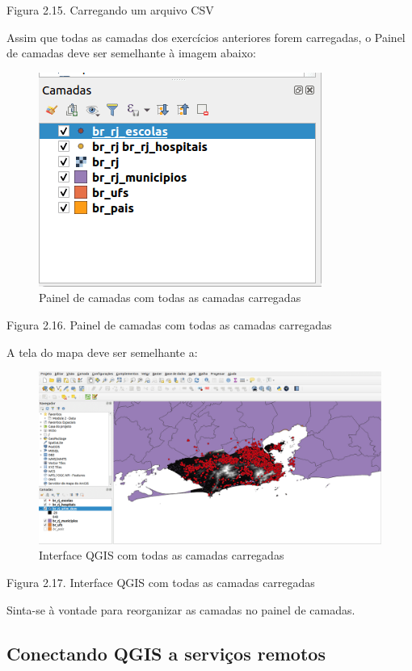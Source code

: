 \documentclass[
]{krantz}
\begin{document}
Figura 2.15. Carregando um arquivo CSV

Assim que todas as camadas dos exercícios anteriores forem carregadas, o Painel de camadas deve ser semelhante à imagem abaixo:

\begin{figure}
\centering
\includegraphics{media/modulo2/layers-panel-2.png}
\caption{Painel de camadas com todas as camadas carregadas}
\end{figure}

Figura 2.16. Painel de camadas com todas as camadas carregadas

A tela do mapa deve ser semelhante a:

\begin{figure}
\centering
\includegraphics{media/modulo2/map-canvas-1.png}
\caption{Interface QGIS com todas as camadas carregadas}
\end{figure}

Figura 2.17. Interface QGIS com todas as camadas carregadas

Sinta-se à vontade para reorganizar as camadas no painel de camadas.

\hypertarget{conectando-qgis-a-serviuxe7os-remotos}{%
\subsection{Conectando QGIS a serviços remotos}\label{conectando-qgis-a-serviuxe7os-remotos}}
\end{document}
